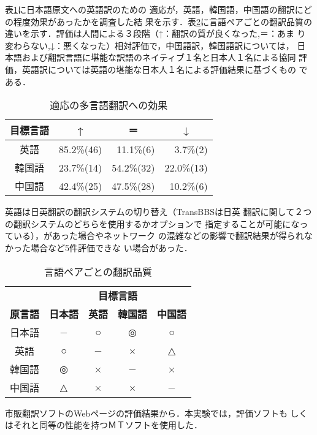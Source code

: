 表\ref{Table:Effect_of_adapation_on_MMT}に日本語原文への英語訳のための
適応が，英語，韓国語，中国語の翻訳にどの程度効果があったかを調査した結
果を示す．表\ref{Table:Translation_quality}に言語ペアごとの翻訳品質の
違いを示す．評価は人間による３段階（↑：翻訳の質が良くなった,＝：あま
り変わらない,↓：悪くなった）相対評価で，中国語訳，韓国語訳については，
日本語および翻訳言語に堪能な訳語のネイティブ１名と日本人１名による協同
評価，英語訳については英語の堪能な日本人１名による評価結果に基づくもの
である．

\begin{table}[htbp]
    \leavevmode
\small
    \caption{適応の多言語翻訳への効果}
    \label{Table:Effect_of_adapation_on_MMT}
    \vspace*{-3mm}
\begin {center}
\begin{tabular}{|c|r|r|r|}
\hline
\multicolumn{1}{|c|}{\bf 目標言語} & 
\multicolumn{1}{c|}{\bf ↑} & 
\multicolumn{1}{c|}{\bf ＝} & 
\multicolumn{1}{c|}{\bf ↓}  \\
\hline
英語   & 85.2\%(46) &  11.1\%(6) &   3.7\%(2) \\
\hline
韓国語 & 23.7\%(14) & 54.2\%(32) & 22.0\%(13) \\
\hline
中国語 & 42.4\%(25) & 47.5\%(28) &  10.2\%(6) \\
\hline 
\end{tabular}
\end{center}
    \footnotesize
      {英語は日英翻訳の翻訳システムの切り替え（TransBBSは日英
       翻訳に関して２つの翻訳システムのどちらを使用するかオプションで
       指定することが可能になっている），があった場合やネットワーク
       の混雑などの影響で翻訳結果が得られなかった場合など5件評価できな
       い場合があった．} 
\end{table}

\begin{table}[htbp]
    \leavevmode
\small
    \caption{言語ペアごとの翻訳品質}
    \label{Table:Translation_quality}
    \vspace*{-3mm}
\begin {center}
\begin{tabular}{|c|c|c|c|c|}
\hline
               & \multicolumn{4}{c|}{\bf 目標言語} \\
\cline{2-5}
{\bf 原言語} & {\bf 日本語} & {\bf 英語} & {\bf 韓国語} & {\bf 中国語}  \\
\hline
日本語 & − & ○ & ◎ & ○  \\
\hline
英語   & ○ & − & × & △  \\
\hline
韓国語 & ◎ & × & − & ×  \\
\hline
中国語 & △ & × & × & −  \\
\hline 
\end{tabular}
\end{center}
   \footnotesize  
    {市販翻訳ソフトのWebページの評価結果から．本実験では，評価ソフトも
     しくはそれと同等の性能を持つＭＴソフトを使用した．}
\end{table}

